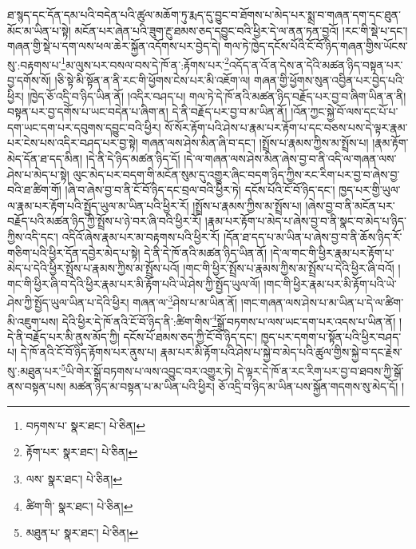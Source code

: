 ཐ་སྙད་དང་དོན་དམ་པའི་བདེན་པའི་ཚུལ་མཆོག་ཏུ་རྨད་དུ་བྱུང་བ་ཐོགས་པ་མེད་པར་སྨྲ་བ་གཞན་དག་དང་ཐུན་མོང་མ་ཡིན་པ་སྟེ། མངོན་པར་ཞེན་པའི་ཟུག་རྔུ་ཐམས་ཅད་དབྱུང་བའི་ཕྱིར་དེ་ལ་ནན་ཏན་བྱའོ། །རང་གི་སྡེ་པ་དང་། གཞན་གྱི་སྡེ་པ་དག་ལས་ཕལ་ཆེར་སྐྱོན་འདོགས་པར་བྱེད་དེ། གལ་ཏེ་ཁྱེད་དངོས་པོའི་ངོ་བོ་ཉིད་གཞན་གྱིས་ཡོངས་སུ་:བརྟགས་པ་\footnote{བཏགས་པ་  སྣར་ཐང་།  པེ་ཅིན། }མ་ལུས་པར་བསལ་བས་དེ་ཁོ་ན་:རྟོགས་པར་\footnote{རྟོག་པར་  སྣར་ཐང་།  པེ་ཅིན། }འདོད་ན་འོ་ན་དེས་ན་དེའི་མཚན་ཉིད་བསྟན་པར་བྱ་དགོས་སོ། །ཅི་སྟེ་མི་སྟོན་ན་ནི་རང་གི་ཕྱོགས་ངེས་པར་མི་འཇོག་ལ། གཞན་གྱི་ཕྱོགས་སུན་འབྱིན་པར་བྱེད་པའི་ཕྱིར། །ཁྱེད་ཅོ་འདྲི་བ་ཉིད་ཡིན་ནོ། །འདིར་བཤད་པ། གལ་ཏེ་དེ་ཁོ་ནའི་མཚན་ཉིད་བརྗོད་པར་བྱ་བ་ཞིག་ཡིན་ན་ནི། བསྟན་པར་བྱ་དགོས་པ་ཡང་བདེན་པ་ཞིག་ན། དེ་ནི་བརྗོད་པར་བྱ་བ་མ་ཡིན་ནོ། །འོན་ཀྱང་སྐྱེ་བོ་ལས་དང་པོ་པ་དག་ཡང་དག་པར་དབུགས་དབྱུང་བའི་ཕྱིར། སོ་སོར་རྟོག་པའི་ཤེས་པ་རྣམ་པར་རྟོག་པ་དང་བཅས་པས་དེ་ལྟར་རྣམ་པར་ངེས་པས་འདིར་བཤད་པར་བྱ་སྟེ། གཞན་ལས་ཤེས་མིན་ཞི་བ་དང་། །སྤྲོས་པ་རྣམས་ཀྱིས་མ་སྤྲོས་པ། །རྣམ་རྟོག་མེད་དོན་ཐ་དད་མིན། །དེ་ནི་དེ་ཉིད་མཚན་ཉིད་དོ། །དེ་ལ་གཞན་ལས་ཤེས་མིན་ཞེས་བྱ་བ་ནི་འདི་ལ་གཞན་ལས་ཤེས་པ་མེད་པ་སྟེ། ལུང་མེད་པར་བདག་གི་མངོན་སུམ་དུ་འགྱུར་ཞིང་བདག་ཉིད་ཀྱིས་རང་རིག་པར་བྱ་བ་ཞེས་བྱ་བའི་ཐ་ཚིག་གོ། །ཞི་བ་ཞེས་བྱ་བ་ནི་ངོ་བོ་ཉིད་དང་བྲལ་བའི་ཕྱིར་ཏེ། དངོས་པོའི་ངོ་བོ་ཉིད་དང་། ཁྱད་པར་གྱི་ཡུལ་ལ་རྣམ་པར་རྟོག་པའི་སྤྱོད་ཡུལ་མ་ཡིན་པའི་ཕྱིར་རོ། །སྤྲོས་པ་རྣམས་ཀྱིས་མ་སྤྲོས་པ། །ཞེས་བྱ་བ་ནི་མངོན་པར་བརྗོད་པའི་མཚན་ཉིད་ཀྱི་སྤྲོས་པ་ཉེ་བར་ཞི་བའི་ཕྱིར་རོ། །རྣམ་པར་རྟོག་པ་མེད་པ་ཞེས་བྱ་བ་ནི་སྣང་བ་མེད་པ་ཉིད་ཀྱིས་འདི་དང་། འདིའོ་ཞེས་རྣམ་པར་མ་བརྟགས་པའི་ཕྱིར་རོ། །དོན་ཐ་དད་པ་མ་ཡིན་པ་ཞེས་བྱ་བ་ནི་ཆོས་ཉིད་རོ་གཅིག་པའི་ཕྱིར་དོན་དབྱེར་མེད་པ་སྟེ། དེ་ནི་དེ་ཁོ་ནའི་མཚན་ཉིད་ཡིན་ནོ། །དེ་ལ་གང་གི་ཕྱིར་རྣམ་པར་རྟོག་པ་མེད་པ་དེའི་ཕྱིར་སྤྲོས་པ་རྣམས་ཀྱིས་མ་སྤྲོས་པའོ། །གང་གི་ཕྱིར་སྤྲོས་པ་རྣམས་ཀྱིས་མ་སྤྲོས་པ་དེའི་ཕྱིར་ཞི་བའོ། །གང་གི་ཕྱིར་ཞི་བ་དེའི་ཕྱིར་རྣམ་པར་མི་རྟོག་པའི་ཡེ་ཤེས་ཀྱི་སྤྱོད་ཡུལ་ལོ། །གང་གི་ཕྱིར་རྣམ་པར་མི་རྟོག་པའི་ཡེ་ཤེས་ཀྱི་སྤྱོད་ཡུལ་ཡིན་པ་དེའི་ཕྱིར། གཞན་ལ་\footnote{ལས་  སྣར་ཐང་།  པེ་ཅིན། }ཤེས་པ་མ་ཡིན་ནོ། །གང་གཞན་ལས་ཤེས་པ་མ་ཡིན་པ་དེ་ལ་ཚིག་མི་འཇུག་པས། དེའི་ཕྱིར་དེ་ཁོ་ནའི་ངོ་བོ་ཉིད་ནི་:ཚིག་གིས་\footnote{ཚིག་གི་  སྣར་ཐང་།  པེ་ཅིན། }སྒྲོ་བཏགས་པ་ལས་ཡང་དག་པར་འདས་པ་ཡིན་ནོ། །དེ་ནི་བརྗོད་པར་མི་ནུས་མོད་ཀྱི། དངོས་པོ་ཐམས་ཅད་ཀྱི་ངོ་བོ་ཉིད་དང་། ཁྱད་པར་དགག་པ་སྟོན་པའི་ཕྱིར་བཤད་པ། དེ་ཁོ་ནའི་ངོ་བོ་ཉིད་རྟོགས་པར་ནུས་པ། རྣམ་པར་མི་རྟོག་པའི་ཤེས་པ་སྐྱེ་བ་མེད་པའི་ཚུལ་གྱིས་སྐྱེ་བ་དང་རྗེས་སུ་:མཐུན་པར་\footnote{མཐུན་པ་  སྣར་ཐང་།  པེ་ཅིན། }ཡི་གེར་སྒྲོ་བཏགས་པ་ལས་འབྱུང་བར་འགྱུར་ཏེ། དེ་ལྟར་དེ་ཁོ་ན་རང་རིག་པར་བྱ་བ་ཐབས་ཀྱི་སྒོ་ནས་བསྟན་པས། མཚན་ཉིད་མ་བསྟན་པ་མ་ཡིན་པའི་ཕྱིར། ཅོ་འདྲི་བ་ཉིད་མ་ཡིན་པས་སྐྱོན་གདགས་སུ་མེད་དོ། །
